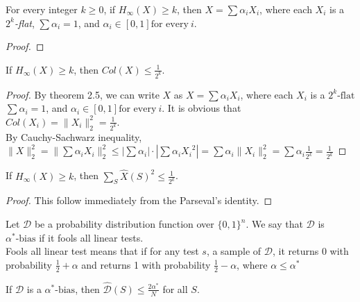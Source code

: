 \begin{theorem}
For every integer $k \geq 0$, if $H_\infty(X) \geq k$, then 
$X = \sum \alpha_i X_i$, where each $X_i$ is a \textit{$2^k$-flat}, $\sum \alpha_i = 1$, and $\alpha_i \in [0,1] \text{for every} \ i$.
\end{theorem}

\begin{proof}

\end{proof}

\begin{theorem}
If $H_\infty(X) \geq k$, then $Col(X) \leq \frac{1}{2^k}$.
\end{theorem}

\begin{proof}
By theorem 2.5, we can write $X$ as $X = \sum \alpha_i X_i$, where each $X_i$ is a $2^k\text{-flat}$ $\sum \alpha_i = 1$, and $\alpha_i \in [0,1] \text{for every} \ i$. It is obvious that $Col(X_i) = \| X_i \|_2^2 = \frac{1}{2^k}$.\\
By Cauchy-Sachwarz inequality, \\
$\| X \|_2^2 
= \| \sum \alpha_i X_i \|_2^2 
\leq | \sum \alpha_i | \cdot | \sum \alpha_i {X_i}^2|
= \sum \alpha_i \| {X_i} \|_2^2 
= \sum \alpha_i \frac{1}{2^k}
= \frac{1}{2^k}$ 
\end{proof}

\begin{theorem}
If $H_\infty(X) \geq k$, then $\sum\limits_{S} \widehat{X}(S)^2 \leq \frac{1}{2^k}$.
\end{theorem}

\begin{proof}
This follow immediately from the Parseval's identity.
\end{proof}

\begin{definition}
Let $\mathcal{D}$ be a probability distribution function over $\{ 0,1 \}^n$.
We say that $\mathcal{D}$ is $\alpha^*\text{-bias}$ if it fools all linear tests. \\
Fools all linear test means that if for any test $s$, a sample of $\mathcal{D}$, it returns 0 with probability $\frac{1}{2}+ \alpha$ and returns 1 with probability $\frac{1}{2} - \alpha$, where $\alpha \leq \alpha^*$
\end{definition}

\begin{theorem}
If $\mathcal{D}$ is a $\alpha^*\text{-bias}$, then $\hat{\mathcal{D}}(S) \leq \frac{2\alpha^*}{N}$ for all $S$.
\end{theorem}

